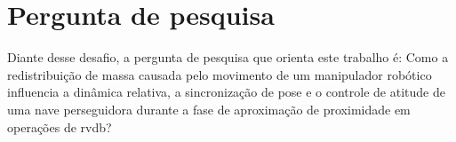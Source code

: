 \section{Pergunta de pesquisa}
\label{sec_pergunta_pesquisa}


Diante desse desafio, a pergunta de pesquisa que orienta este trabalho é: Como a redistribuição de massa causada pelo movimento de um manipulador robótico influencia a dinâmica relativa, a sincronização de pose e o controle de atitude de uma nave perseguidora durante a fase de aproximação de proximidade em operações de \gls{rvdb}? 
